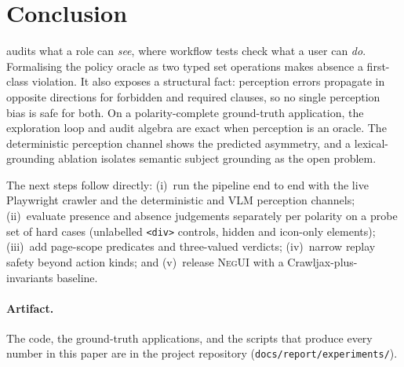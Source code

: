 \section{Conclusion}
\label{sec:conclusion}

\sys{} audits what a role can \emph{see}, where workflow tests check what a
user can \emph{do}. Formalising the policy oracle as two typed set operations
makes absence a first-class violation. It also exposes a structural fact:
perception errors propagate in opposite directions for forbidden and required
clauses, so no single perception bias is safe for both. On a polarity-complete
ground-truth application, the exploration loop and audit algebra are exact
when perception is an oracle. The deterministic perception channel shows the
predicted asymmetry, and a lexical-grounding ablation isolates semantic
subject grounding as the open problem.

The next steps follow directly:
(i)~run the pipeline end to end with the live Playwright crawler and the
deterministic and VLM perception channels;
(ii)~evaluate presence and absence judgements separately per polarity on a
probe set of hard cases (unlabelled \texttt{<div>} controls, hidden and
icon-only elements);
(iii)~add page-scope predicates and three-valued verdicts;
(iv)~narrow replay safety beyond action kinds; and
(v)~release \textsc{NegUI} with a Crawljax-plus-invariants baseline.

\paragraph{Artifact.}
The code, the ground-truth applications, and the scripts that produce every
number in this paper are in the project repository
(\nolinkurl{docs/report/experiments/}).
